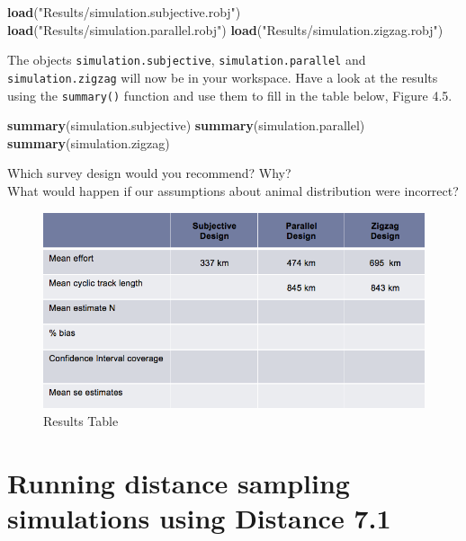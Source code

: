 \documentclass[]{book}
\newenvironment{Shaded}{\begin{snugshade}}{\end{snugshade}}
\newcommand{\KeywordTok}[1]{\textcolor[rgb]{0.13,0.29,0.53}{\textbf{#1}}}
\newcommand{\StringTok}[1]{\textcolor[rgb]{0.31,0.60,0.02}{#1}}
\newcommand{\NormalTok}[1]{#1}
\theoremstyle{definition}
\theoremstyle{definition}
\theoremstyle{remark}
\begin{document}
\begin{Shaded}
\begin{Highlighting}[]
\KeywordTok{load}\NormalTok{(}\StringTok{"Results/simulation.subjective.robj"}\NormalTok{)}
\KeywordTok{load}\NormalTok{(}\StringTok{"Results/simulation.parallel.robj"}\NormalTok{)}
\KeywordTok{load}\NormalTok{(}\StringTok{"Results/simulation.zigzag.robj"}\NormalTok{)}
\end{Highlighting}
\end{Shaded}

The objects \texttt{simulation.subjective}, \texttt{simulation.parallel}
and \texttt{simulation.zigzag} will now be in your workspace. Have a
look at the results using the \texttt{summary()} function and use them
to fill in the table below, Figure 4.5.

\begin{Shaded}
\begin{Highlighting}[]
\KeywordTok{summary}\NormalTok{(simulation.subjective)}
\KeywordTok{summary}\NormalTok{(simulation.parallel)}
\KeywordTok{summary}\NormalTok{(simulation.zigzag)}
\end{Highlighting}
\end{Shaded}

Which survey design would you recommend? Why?\\
What would happen if our assumptions about animal distribution were
incorrect?

\begin{figure}
\centering
\includegraphics{images/results.png}
\caption{Results Table}
\end{figure}

\hypertarget{running-distance-sampling-simulations-using-distance-7.1}{\section{Running
distance sampling simulations using Distance
7.1}\label{running-distance-sampling-simulations-using-distance-7.1}}
\end{document}
